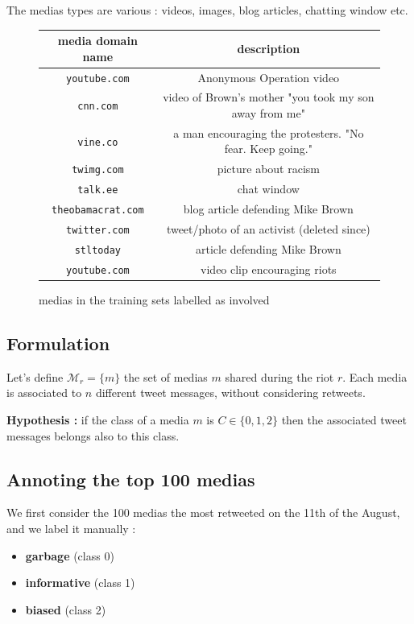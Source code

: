 \documentclass[a4paper,12pt]{report}
\begin{document}
The medias types are various : videos, images, blog articles, chatting window etc.
\begin{figure}[H]
  \centering
\begin{tabular}{|c|c|}
\hline
media domain name & description \\ \hline
\texttt{youtube.com} & Anonymous Operation video \\ \hline
\texttt{cnn.com} & video of Brown's mother "you took my son away from me" \\
\texttt{vine.co} & a man encouraging the protesters. "No fear. Keep going." \\ \hline
\texttt{twimg.com} & picture about racism \\ \hline
\texttt{talk.ee} & chat window \\ \hline
\texttt{theobamacrat.com} & blog article defending Mike Brown \\ \hline
\texttt{twitter.com} & tweet/photo of an activist (deleted since) \\ \hline
\texttt{stltoday} & article defending Mike Brown \\ \hline
\texttt{youtube.com} & video clip encouraging riots \\ \hline
\hline
\end{tabular}
\label{tweets500mediasBiaised}
\caption{medias in the training sets labelled as involved}
\end{figure}

\newpage

\subsection{Formulation}
Let's define $ \mathcal{M}_r = \{ m \} $ the set of medias $m$ shared during the riot $r$. Each media is associated to $n$ different tweet messages, without considering retweets.

\textbf{Hypothesis :} if the class of a media $m$ is $C \in \{0,1,2\}$ then the associated tweet messages belongs also to this class.

\subsection{Annoting the top 100 medias}
We first consider the 100 medias the most retweeted on the 11th of the August, and we label it manually :
\begin{itemize}
\item \textbf{garbage} (class 0)
\item \textbf{informative} (class 1)
\item \textbf{biased} (class 2)
\end{itemize}
\end{document}
